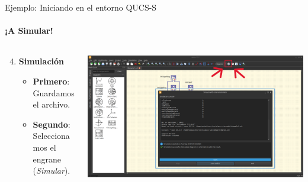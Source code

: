 \documentclass{beamer}
\begin{document}
\begin{frame}[fragile]{Ejemplo: Iniciando en el entorno QUCS-S}
  \framesubtitle{¡A Simular!}

  \begin{columns}[T]
    \begin{column}{0.5\textwidth}
      \begin{enumerate}
        \setcounter{enumi}{3} %
        \item \textbf{Simulación}
          \begin{itemize}
            \item \textbf{Primero}: Guardamos el archivo.
            \item \textbf{Segundo}: Seleccionamos el engrane (\textit{Simular}).
          \end{itemize}
      \end{enumerate}
    \end{column}

    \begin{column}{0.5\textwidth}
      \includegraphics[width=\columnwidth]{Imagenes/Sim.png}
    \end{column}
  \end{columns}
\end{frame}
\end{document}
